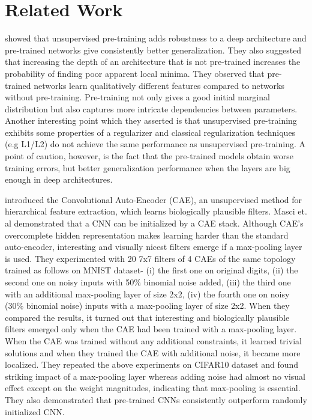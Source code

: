 \documentclass{article}
\begin{document}
\section{Related Work}
\cite{Erhan10} showed that unsupervised pre-training adds robustness to a deep architecture and pre-trained networks give consistently better
generalization. They also suggested that increasing the depth of an architecture that is not pre-trained increases the probability of finding poor apparent local minima. They observed that pre-trained networks learn qualitatively different features compared to networks without pre-training. Pre-training not only gives a good initial
marginal distribution but also captures more intricate dependencies between parameters. Another interesting point which they asserted is that unsupervised pre-training exhibits some properties of a regularizer and classical regularization techniques (e.g L1/L2) do not achieve
the same performance as unsupervised pre-training. A point of caution, however, is the fact that the pre-trained models obtain worse training errors, but better generalization performance when the layers are big enough in deep architectures.

\cite{masci11} introduced the Convolutional Auto-Encoder (CAE), an unsupervised method for hierarchical feature extraction, which learns biologically plausible filters. Masci et. al demonstrated that a CNN can be initialized by a CAE stack. Although CAE’s overcomplete hidden representation makes learning harder than the standard auto-encoder,  interesting and visually nicest filters emerge if a max-pooling layer is used. They experimented with 20 7x7 filters of 4 CAEs of the same topology trained as follows on MNIST dataset- (i) the first one on original digits, (ii) the second one on noisy inputs with 50\% binomial noise added,
(iii) the third one with an additional max-pooling layer of size 2x2,
(iv) the fourth one on noisy (30\% binomial noise) inputs with a max-pooling layer of size 2x2.
When they compared the results, it turned out that interesting and biologically plausible filters emerged only when the CAE had been trained with a max-pooling layer. When the CAE was trained without any additional constraints, it learned trivial solutions and when they trained the CAE with additional noise, it became more localized. They repeated the above experiments on CIFAR10 dataset and found striking impact of a max-pooling layer whereas adding noise had almost no visual effect except on the weight magnitudes, indicating that max-pooling is essential. They also demonstrated that pre-trained CNNs consistently outperform randomly initialized CNN.
\end{document}
